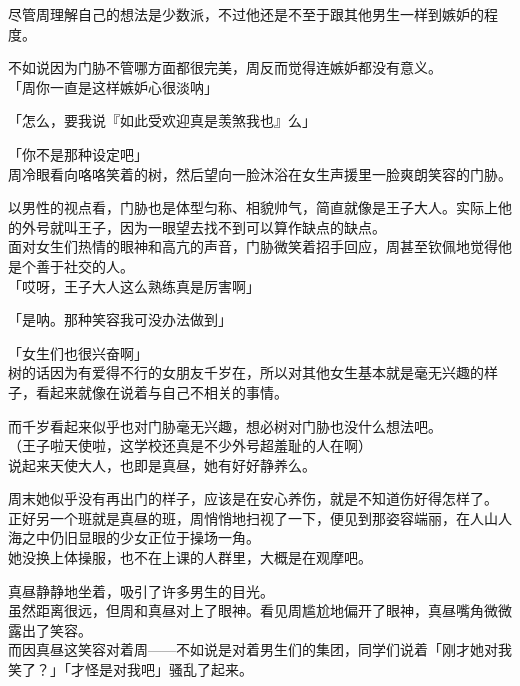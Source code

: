 尽管周理解自己的想法是少数派，不过他还是不至于跟其他男生一样到嫉妒的程度。

不如说因为门胁不管哪方面都很完美，周反而觉得连嫉妒都没有意义。\\

「周你一直是这样嫉妒心很淡呐」

「怎么，要我说『如此受欢迎真是羡煞我也』么」

「你不是那种设定吧」\\

周冷眼看向咯咯笑着的树，然后望向一脸沐浴在女生声援里一脸爽朗笑容的门胁。

以男性的视点看，门胁也是体型匀称、相貌帅气，简直就像是王子大人。实际上他的外号就叫王子，因为一眼望去找不到可以算作缺点的缺点。\\

面对女生们热情的眼神和高亢的声音，门胁微笑着招手回应，周甚至钦佩地觉得他是个善于社交的人。\\

「哎呀，王子大人这么熟练真是厉害啊」

「是呐。那种笑容我可没办法做到」

「女生们也很兴奋啊」\\

树的话因为有爱得不行的女朋友千岁在，所以对其他女生基本就是毫无兴趣的样子，看起来就像在说着与自己不相关的事情。

而千岁看起来似乎也对门胁毫无兴趣，想必树对门胁也没什么想法吧。\\

（王子啦天使啦，这学校还真是不少外号超羞耻的人在啊）\\

说起来天使大人，也即是真昼，她有好好静养么。

周末她似乎没有再出门的样子，应该是在安心养伤，就是不知道伤好得怎样了。\\

正好另一个班就是真昼的班，周悄悄地扫视了一下，便见到那姿容端丽，在人山人海之中仍旧显眼的少女正位于操场一角。\\

她没换上体操服，也不在上课的人群里，大概是在观摩吧。

真昼静静地坐着，吸引了许多男生的目光。\\

虽然距离很远，但周和真昼对上了眼神。看见周尴尬地偏开了眼神，真昼嘴角微微露出了笑容。\\

而因真昼这笑容对着周——不如说是对着男生们的集团，同学们说着「刚才她对我笑了？」「才怪是对我吧」骚乱了起来。\\

